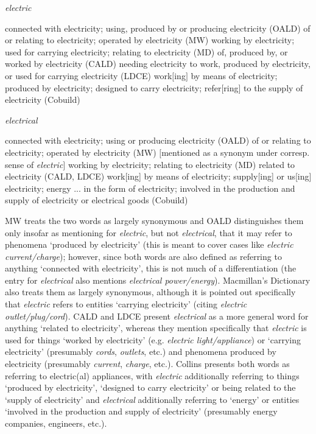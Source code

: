 \begin{exe}
\ex \textit{electric}
\begin{xlist}
\label{ex:definitionelectric}
\ex connected with electricity; using, produced by or producing electricity (OALD)
\ex of or relating to electricity; operated by electricity (MW)
\ex working by electricity; used for carrying electricity; relating to electricity (MD)
\ex of, produced by, or worked by electricity (CALD)
\ex needing electricity to work, produced by electricity, or used for carrying electricity (LDCE)
\ex work$[$ing$]$ by means of electricity; produced by electricity; designed to carry electricity; refer$[$ring$]$ to the supply of electricity (Cobuild)
\end{xlist}
\end{exe}

\begin{exe}
\ex \textit{electrical}
\begin{xlist}
\label{ex:definitionelectrical}
\ex connected with electricity; using or producing electricity (OALD)
\ex of or relating to electricity; operated by electricity (MW) $[$mentioned as a synonym under corresp. sense of \textit{electric}$]$
\ex working by electricity; relating to electricity (MD)
\ex related to electricity (CALD, LDCE)
\ex work[ing] by means of electricity; supply[ing] or us[ing] electricity; energy ... in the form of electricity; involved in the production and supply of electricity or electrical goods (Cobuild)
\end{xlist}
\end{exe}

MW treats the two words as largely synonymous  and OALD distinguishes them only insofar as mentioning for \textit{electric}, but not \textit{electrical}, that it may refer to phenomena `produced by electricity' (this is meant to cover cases like \textit{electric current\slash charge}); however, since both words are also defined as referring to anything `connected with electricity', this is not much of a differentiation (the entry for \textit{electrical} also mentions \textit{electrical power\slash energy}). Macmillan's Dictionary  also treats them as largely synonymous,  although it is pointed out specifically that \textit{electric} refers to entities `carrying electricity' (citing \textit{electric outlet\slash plug\slash cord}). CALD and LDCE present \textit{electrical} as a more general word for anything `related to electricity', whereas they mention specifically that \textit{electric} is used for things `worked by electricity' (e.g. \textit{electric light\slash appliance}) or `carrying electricity' (presumably \textit{cords}, \textit{outlets}, etc.) and phenomena produced by electricity (presumably \textit{current}, \textit{charge}, etc.). Collins presents both words as referring to electric(al) appliances, with \textit{electric} additionally referring to things `produced by electricity', `designed to carry electricity' or being related to the `supply of electricity' and \textit{electrical} additionally referring to `energy' or entities `involved in the production and supply of electricity' (presumably energy companies, engineers, etc.).

